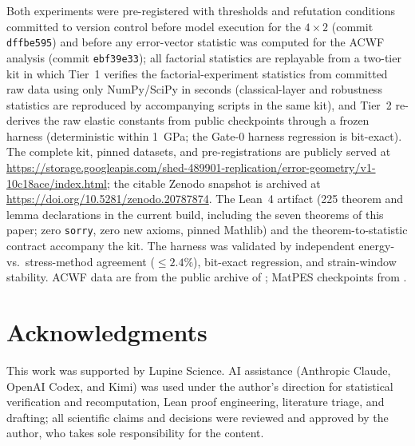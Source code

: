 \documentclass[11pt]{article}
\begin{document}
Both experiments were pre-registered with thresholds and refutation
conditions committed to version control before model execution for the
$4{\times}2$ (commit \texttt{dffbe595}) and before any error-vector statistic
was computed for the ACWF analysis (commit \texttt{ebf39e33}); all factorial
statistics are replayable from a two-tier kit in which Tier~1 verifies the
factorial-experiment statistics from committed raw data using only
NumPy/SciPy in seconds (classical-layer and robustness statistics are
reproduced by accompanying scripts in the same kit), and Tier~2 re-derives
the raw elastic constants from public checkpoints through a frozen harness
(deterministic within 1~GPa; the Gate-0 harness regression is bit-exact).
The complete kit, pinned datasets, and pre-registrations are publicly served at \url{https://storage.googleapis.com/shed-489901-replication/error-geometry/v1-10c18ace/index.html}; the citable Zenodo snapshot is archived at \url{https://doi.org/10.5281/zenodo.20787874}. The Lean~4 artifact (225 theorem and lemma declarations in the current
build, including the seven theorems of this paper; zero \texttt{sorry}, zero
new axioms, pinned Mathlib) and the theorem-to-statistic contract accompany
the kit. The harness was validated by
independent energy- vs.\ stress-method agreement ($\le 2.4\%$), bit-exact
regression, and strain-window stability. ACWF data are from the public
archive of \citet{bosoni2024}; MatPES checkpoints from \citet{kaplan2025}.

\section*{Acknowledgments}
This work was supported by Lupine Science. AI assistance (Anthropic Claude, OpenAI Codex, and Kimi)
was used under the author's direction for statistical verification and
recomputation, Lean proof engineering, literature triage, and drafting; all
scientific claims and decisions were reviewed and approved by the author, who
takes sole responsibility for the content.



\end{document}
